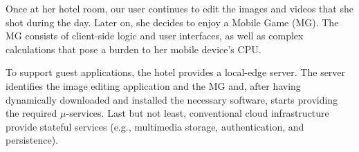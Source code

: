 


Once at her hotel room, our user continues to edit the images and videos that she shot during the day. Later on, she decides to enjoy a Mobile Game (MG). The MG consists of client-side logic and user interfaces, as well as complex calculations that pose a burden to her mobile device's CPU. 

To support guest applications, the hotel provides a local-edge server. The server identifies the image editing application and the MG and, after having dynamically downloaded and installed the necessary software, starts providing the required $\mu$-services. %
Last but not least, conventional cloud infrastructure provide stateful services (e.g., multimedia storage, authentication, and persistence).%


